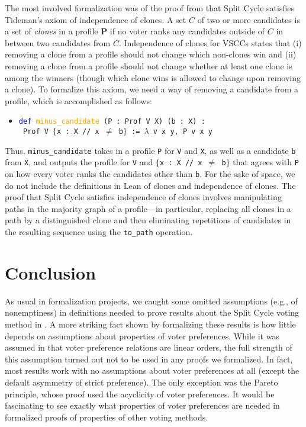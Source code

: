 \documentclass[runningheads]{llncs}
\begin{document}
The most involved formalization was of the proof from \cite{HP2020} that Split Cycle satisfies Tideman's \cite{Tideman1987} axiom of independence of clones. A set $C$ of two or more candidates is a set of \textit{clones} in a profile $\mathbf{P}$ if no voter ranks any candidates outside of $C$ in between two candidates from $C$. Independence of clones for VSCCs states that (i) removing a clone from a profile should not change which non-clones win and (ii) removing a clone from a profile should not change whether at least one clone is among the winners (though which clone wins is allowed to change upon removing a clone). To formalize this axiom, we need a way of removing a candidate from a profile, which is accomplished as follows:
\begin{itemize}
\item[] \texttt{\textcolor{blue}{def} \textcolor{orange}{minus\_candidate} (P : Prof V X) (b : X) :} \\
\texttt{ Prof V $\{$x : X // x $\neq$ b$\}$ := $\lambda$ v x y, P v x y}
\end{itemize}
Thus, \texttt{minus\_candidate} takes in a profile \texttt{P} for \texttt{V} and \texttt{X}, as well as a candidate \texttt{b} from \texttt{X}, and outputs the profile for \texttt{V} and \texttt{$\{$x : X // x $\neq$ b$\}$} that agrees with \texttt{P} on how every voter ranks the candidates other than \texttt{b}. For the sake of space, we do not include the definitions in Lean of clones and independence of clones. The proof that Split Cycle satisfies independence of clones involves manipulating paths in the majority graph of a profile---in particular, replacing all clones in a path by a distinguished clone and then eliminating repetitions of candidates in the resulting sequence using the \texttt{to\_path} operation.

\section{Conclusion}\label{Conclusion}

As usual in formalization projects, we caught some omitted assumptions (e.g., of nonemptiness) in definitions needed to prove results about the Split Cycle voting method in \cite{HP2020}.  A more striking fact shown by formalizing these results is how little depends on assumptions about properties of voter preferences. While it was assumed in \cite{HP2020} that voter preference relations are linear orders, the full strength of this assumption turned out not to be used in any proofs we formalized. In fact, most results work with no assumptions about voter preferences at all (except the default asymmetry of strict preference). The only exception was the Pareto principle, whose proof used the acyclicity of voter preferences. It would be fascinating to see exactly what properties of voter preferences are needed in formalized proofs of properties of other voting methods.
\end{document}
